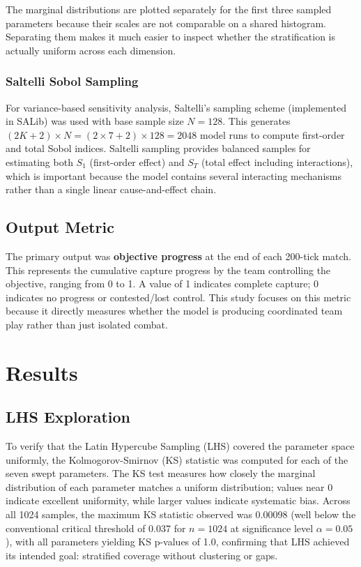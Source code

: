 \documentclass{assignment}
\begin{document}
The marginal distributions are plotted separately for the first three sampled parameters because their scales are not comparable on a shared histogram. Separating them makes it much easier to inspect whether the stratification is actually uniform across each dimension.

\subsubsection{Saltelli Sobol Sampling}
For variance-based sensitivity analysis, Saltelli's sampling scheme (implemented in SALib) was used with base sample size $N = 128$. This generates $(2K + 2) \times N = (2 \times 7 + 2) \times 128 = 2048$ model runs to compute first-order and total Sobol indices. Saltelli sampling provides balanced samples for estimating both $S_1$ (first-order effect) and $S_T$ (total effect including interactions), which is important because the model contains several interacting mechanisms rather than a single linear cause-and-effect chain.

\subsection{Output Metric}

The primary output was \textbf{objective progress} at the end of each 200-tick match. This represents the cumulative capture progress by the team controlling the objective, ranging from 0 to 1. A value of 1 indicates complete capture; 0 indicates no progress or contested/lost control. This study focuses on this metric because it directly measures whether the model is producing coordinated team play rather than just isolated combat.

\section{Results}

\subsection{LHS Exploration}

To verify that the Latin Hypercube Sampling (LHS) covered the parameter space uniformly, the Kolmogorov-Smirnov (KS) statistic was computed for each of the seven swept parameters. The KS test measures how closely the marginal distribution of each parameter matches a uniform distribution; values near 0 indicate excellent uniformity, while larger values indicate systematic bias. Across all 1024 samples, the maximum KS statistic observed was 0.00098 (well below the conventional critical threshold of 0.037 for $n=1024$ at significance level $\alpha=0.05$), with all parameters yielding KS p-values of 1.0, confirming that LHS achieved its intended goal: stratified coverage without clustering or gaps.
\end{document}
